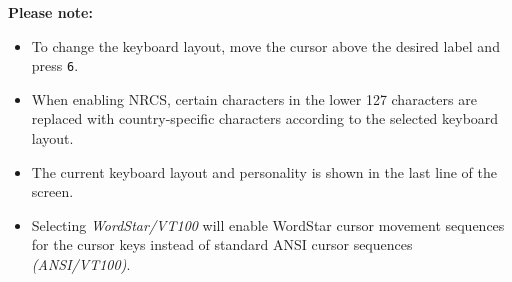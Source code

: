 \textbf{Please note:}
\begin{itemize}
 \item To change the keyboard layout, move the cursor above the desired label and press \texttt{6}.
 \item When enabling NRCS, certain characters in the lower 127 characters are replaced with country-specific characters according to the
       selected keyboard layout.
 \item The current keyboard layout and personality is shown in the last line of the screen.
 \item Selecting \textit{WordStar/VT100} will enable WordStar cursor movement sequences for the cursor keys instead of standard ANSI
       cursor sequences \textit{(ANSI/VT100)}.
\end{itemize}

